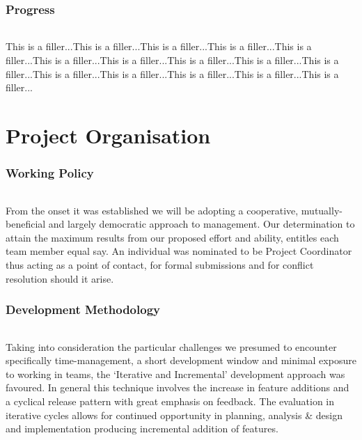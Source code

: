 \documentclass[11pt,a4paper]{article}
\begin{document}
\section{Progress}
\paragraph{}
This is a filler...This is a filler...This is a filler...This is a filler...This is a filler...This is a filler...This is a filler...This is a filler...This is a filler...This is a filler...This is a filler...This is a filler...This is a filler...This is a filler...This is a filler...

\pagebreak

\part{Project Organisation}

\section{Working Policy}
\paragraph{}
From the onset it was established we will be adopting a cooperative, mutually-beneficial and largely democratic approach to management.  Our determination to attain the maximum results from our proposed effort and ability, entitles each team member equal say.  An individual was nominated to be Project Coordinator thus acting as a point of contact, for formal submissions and for conflict resolution should it arise.

\section{Development Methodology}
\paragraph{}
Taking into consideration the particular challenges we presumed to encounter specifically time-management, a short development window and minimal exposure to working in teams, the ‘Iterative and Incremental’ development approach was favoured.  In general this technique involves the increase in feature additions and a cyclical release pattern with great emphasis on feedback.  The evaluation in iterative cycles allows for continued opportunity in planning, analysis \& design and implementation producing incremental addition of features.
\end{document}

